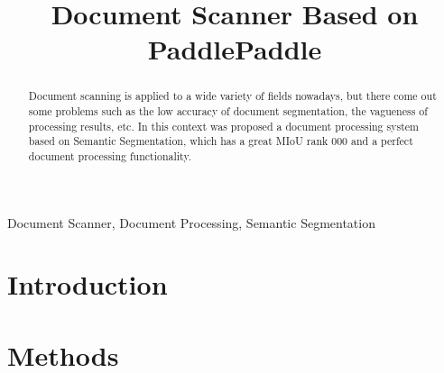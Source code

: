 \documentclass[10pt, conference, compsocconf]{IEEEtran}
\begin{document}
	\title{Document Scanner Based on PaddlePaddle}
	
	\author{
		}
	\maketitle
	\begin{abstract}
		
	Document scanning is applied to a wide variety of fields nowadays, but there come out some problems such as the low accuracy of document segmentation, the vagueness of processing results, etc. In this context was proposed a document processing system based on Semantic Segmentation, which has a great MIoU rank 000 and a perfect document processing functionality. 
		
	\end{abstract}
	
	\begin{IEEEkeywords}
		
		Document Scanner, Document Processing, Semantic Segmentation
		
	\end{IEEEkeywords}
	
	\IEEEpeerreviewmaketitle
	
	\section{Introduction}
	

	
	\section{Methods}
\end{document}
